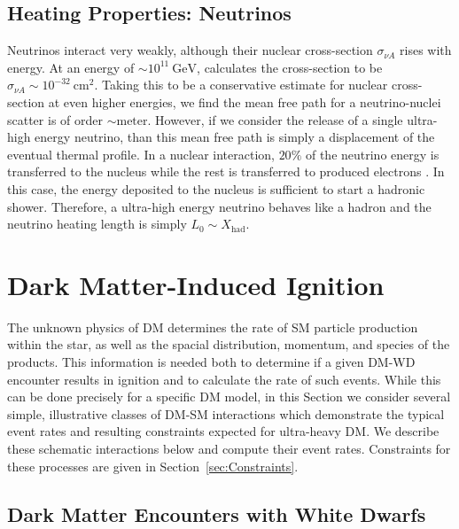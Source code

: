 \documentclass[preprintnumbers,amsmath,amssymb,prd, superscriptaddress,twocolumn]{revtex4}
\newcommand{\GeV}{\text{GeV}}
\newcommand{\cm}{\text{cm}}
\begin{document}
\subsection{Heating Properties: Neutrinos}

Neutrinos interact very weakly, although their nuclear cross-section $\sigma_{\nu A}$ rises with energy.
At an energy of $\sim 10^{11} ~\GeV$, \cite{Formaggio:2013kya} calculates the cross-section to be $\sigma_{\nu A} \sim 10^{-32} ~\cm^2$.
Taking this to be a conservative estimate for nuclear cross-section at even higher energies, we find the mean free path for a neutrino-nuclei scatter is of order $\sim \text{meter}$.
However, if we consider the release of a single ultra-high energy neutrino, than this mean free path is simply a displacement of the eventual thermal profile.
In a nuclear interaction, $20 \%$ of the neutrino energy is transferred to the nucleus while the rest is transferred to produced electrons \cite{Formaggio:2013kya}.
In this case, the energy deposited to the nucleus is sufficient to start a hadronic shower.
Therefore, a ultra-high energy neutrino behaves like a hadron and the neutrino heating length is simply $L_0 \sim X_\text{had}$.

\section{Dark Matter-Induced Ignition}
\label{sec:DMexplode}

The unknown physics of DM determines the rate of SM particle production within the star, as well as the spacial distribution, momentum, and species of the products.
This information is needed both to determine if a given DM-WD encounter results in ignition and to calculate the rate of such events.
While this can be done precisely for a specific DM model, in this Section we consider several simple, illustrative classes of DM-SM interactions which demonstrate the typical event rates and resulting constraints expected for ultra-heavy DM.
We describe these schematic interactions below and compute their event rates.
Constraints for these processes are given in Section~\ref{sec:Constraints}.

\subsection{Dark Matter Encounters with White Dwarfs}
\end{document}
